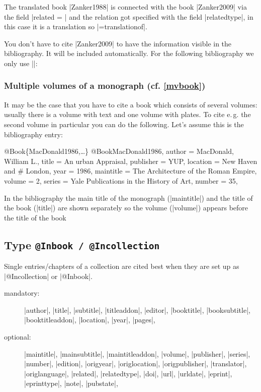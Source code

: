 \documentclass[a4paper,
10pt,
greek,
french,
spanish,
italian,
ngerman,
english,
]{ltxdoc}
\begin{document}
The translated book |Zanker1988| is connected with the book |Zanker2009| via the field |related = | 
and the relation got specified with the field |relatedtype|, in this case it is a translation so |={translationof}|.

You don't have to cite |Zanker2009| to have the information visible in the bibliography. 
It will be included automatically. For the following bibliography we only use |\cite{Zanker1988}|:



\subsubsection{Multiple volumes of a monograph (cf. \cref{mvbook})}
It may be the case that you have to cite a book which consists of several volumes:
usually there is a volume with text and one volume with plates.
To cite  e.\,g. the second volume in particular you can do the following.
Let’s assume this is the bibliography entry:
\begin{bibexample}[label=MacDonald1986]{{@}Book\{MacDonald1986,…\}}
@Book{MacDonald1986,
  author    = {MacDonald, William L.},
  title     = {An urban Appraisal},
  publisher = YUP,    %
  location  = {New Haven and }# London, %
  year      = {1986},
  maintitle = {The Architecture of the Roman Empire},
  volume    = {2},
  series    = {Yale Publications in the History of Art},
  number    = {35},
}
\end{bibexample}
In the bibliography the main title of the monograph (|maintitle|)
and the title of the book (|title|) are shown separately  so the volume  (|volume|) 
appears before the title of the book


\subsection{Type \texttt{@Inbook / @Incollection}}\label{inbook}
Single entries/chapters of a collection are cited best when they are set up as  |@Incollection| or |@Inbook|.

\begin{description}
\item[mandatory:] 
|author|, |title|, |subtitle|, |titleaddon|,
|editor|,  |booktitle|, |booksubtitle|, |booktitleaddon|,
|location|, |year|, |pages|, 
\item[optional:]
|maintitle|, |mainsubtitle|, |maintitleaddon|, |volume|, 
|publisher|, |series|, |number|, |edition|, 
|origyear|, |origlocation|, |origpublisher|, 
|translator|, |origlanguage|,
|related|, |relatedtype|,
|doi|, |url|, |urldate|, |eprint|, |eprinttype|, |note|, |pubstate|, 
 \end{description}
 
\end{document}
